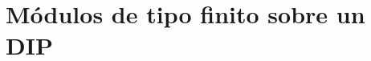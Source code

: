 \documentclass{article}
\theoremstyle{theorem-style}  %
\theoremstyle{definition}
\theoremstyle{example-style}
\begin{document}
\maketitle



\newpage
\tableofcontents
\newpage


\section{Módulos de tipo finito sobre un DIP}
\end{document}
